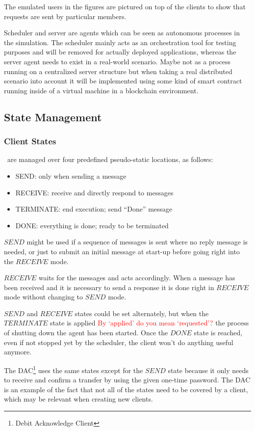 The emulated users in the figures are pictured on top of the clients to show that requests are sent by particular members.

Scheduler and server are agents which can be seen as autonomous processes in the simulation. The scheduler mainly acts as an orchestration tool for testing purposes and will be removed for actually deployed applications, whereas the server agent needs to exist in a real-world scenario. Maybe not as a process running on a centralized server structure but when taking a real distributed scenario into account it will be implemented using some kind of smart contract running inside of a virtual machine in a blockchain environment.

\subsection{State Management}
\label{subsec:impl-states}

\subsubsection{Client States}\ are managed over four predefined pseudo-static locations, as follows:
\begin{itemize}
	\item SEND: only when sending a message
	\item RECEIVE: receive and directly respond to messages
	\item TERMINATE: end execution; send ``Done'' message
	\item DONE: everything is done; ready to be terminated
\end{itemize}
$SEND$ might be used if a sequence of messages is sent where no reply message is needed, or just to submit an initial message at start-up before going right into the $RECEIVE$ mode.

$RECEIVE$ waits for the messages and acts accordingly. When a message has been received and it is necessary to send a response it is done right in $RECEIVE$ mode without changing to $SEND$ mode.

$SEND$ and $RECEIVE$ states could be set alternately, but when the $TERMINATE$ state is applied \textcolor{red}{By `applied' do you mean `requested'?} the process of shutting down the agent has been started. Once the $DONE$ state is reached, even if not stopped yet by the scheduler, the client won't do anything useful anymore.

The DAC\footnote{Debit Acknowledge Client} uses the same states except for the $SEND$ state because it only needs to receive and confirm a transfer by using the given one-time password. The DAC is an example of the fact that not all of the states need to be covered by a client, which may be relevant when creating new clients.


